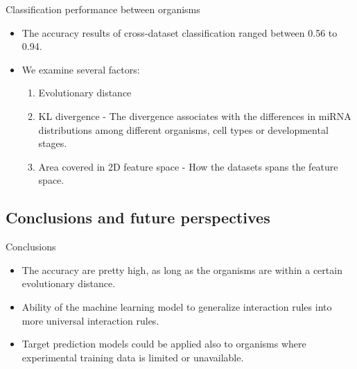 \documentclass{beamer}
\begin{document}
\begin{frame}{Classification performance between organisms}
\begin{itemize}
\item The accuracy results of cross-dataset classification ranged between 0.56 to 0.94. 
\item We examine several factors:
\begin{enumerate}
\item Evolutionary distance
\begin{table}[h!]
\label{tab:evolutiontime}
\end{table}
\item KL divergence - The divergence associates with the differences in miRNA distributions among different organisms, cell types or developmental stages.
\item Area covered in 2D feature space - How the datasets spans the feature space.
\end{enumerate}

 
\end{itemize}
\end{frame}


\subsection{Conclusions and future perspectives}
\begin{frame}{Conclusions}
\begin{itemize}
\item The accuracy are pretty high, as long as the organisms are within a certain evolutionary distance.
\item Ability of the machine learning model to generalize interaction rules into more universal interaction rules. 
\item Target prediction models could be applied also to organisms where experimental training data is limited or unavailable.
\end{itemize}
\end{frame}
\end{document}
